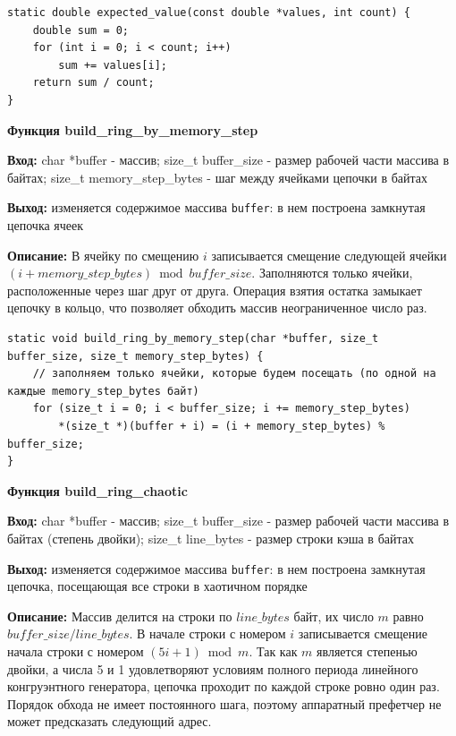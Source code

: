 \begin{lstlisting}[caption=expected\_value, label=lst:expected-value]
static double expected_value(const double *values, int count) {
    double sum = 0;
    for (int i = 0; i < count; i++)
        sum += values[i];
    return sum / count;
}
\end{lstlisting}

\textbf{Функция build\_ring\_by\_memory\_step } \par
\textbf{Вход:} char *buffer - массив; size\_t buffer\_size - размер рабочей части массива в байтах; size\_t memory\_step\_bytes - шаг между ячейками цепочки в байтах \par
\textbf{Выход:} изменяется содержимое массива \texttt{buffer}: в нем построена замкнутая цепочка ячеек \par
\textbf{Описание:} В ячейку по смещению $i$ записывается смещение следующей ячейки $(i + memory\_step\_bytes) \bmod buffer\_size$. Заполняются только ячейки, расположенные через шаг друг от друга. Операция взятия остатка замыкает цепочку в кольцо, что позволяет обходить массив неограниченное число раз.\par

\newpage

\begin{lstlisting}[caption=build\_ring\_by\_memory\_step, label=lst:build-ring-by-memory-step]
static void build_ring_by_memory_step(char *buffer, size_t buffer_size, size_t memory_step_bytes) {
    // заполняем только ячейки, которые будем посещать (по одной на каждые memory_step_bytes байт)
    for (size_t i = 0; i < buffer_size; i += memory_step_bytes)
        *(size_t *)(buffer + i) = (i + memory_step_bytes) % buffer_size;
}
\end{lstlisting}

\textbf{Функция build\_ring\_chaotic } \par
\textbf{Вход:} char *buffer - массив; size\_t buffer\_size - размер рабочей части массива в байтах (степень двойки); size\_t line\_bytes - размер строки кэша в байтах \par
\textbf{Выход:} изменяется содержимое массива \texttt{buffer}: в нем построена замкнутая цепочка, посещающая все строки в хаотичном порядке \par
\textbf{Описание:} Массив делится на строки по $line\_bytes$ байт, их число $m$ равно \\ $buffer\_size / line\_bytes$. В начале строки с номером $i$ записывается смещение начала строки с номером $(5i + 1) \bmod m$. Так как $m$ является степенью двойки, а числа 5 и 1 удовлетворяют условиям полного периода линейного конгруэнтного генератора, цепочка проходит по каждой строке ровно один раз. Порядок обхода не имеет постоянного шага, поэтому аппаратный префетчер не может предсказать следующий адрес.\par
\vspace{10pt}

